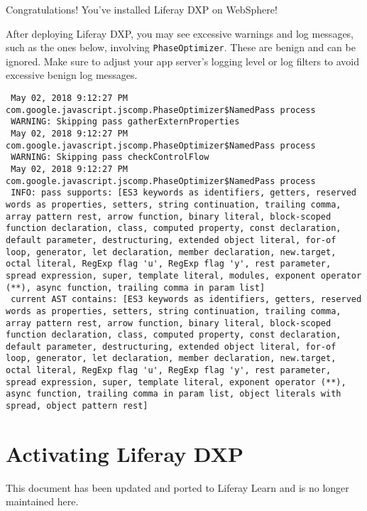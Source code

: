 Congratulations! You've installed Liferay DXP on WebSphere!

\noindent\hrulefill

After deploying Liferay DXP, you may see excessive warnings and log
messages, such as the ones below, involving \texttt{PhaseOptimizer}.
These are benign and can be ignored. Make sure to adjust your app
server's logging level or log filters to avoid excessive benign log
messages.

\begin{verbatim}
 May 02, 2018 9:12:27 PM com.google.javascript.jscomp.PhaseOptimizer$NamedPass process
 WARNING: Skipping pass gatherExternProperties
 May 02, 2018 9:12:27 PM com.google.javascript.jscomp.PhaseOptimizer$NamedPass process
 WARNING: Skipping pass checkControlFlow
 May 02, 2018 9:12:27 PM com.google.javascript.jscomp.PhaseOptimizer$NamedPass process
 INFO: pass supports: [ES3 keywords as identifiers, getters, reserved words as properties, setters, string continuation, trailing comma, array pattern rest, arrow function, binary literal, block-scoped function declaration, class, computed property, const declaration, default parameter, destructuring, extended object literal, for-of loop, generator, let declaration, member declaration, new.target, octal literal, RegExp flag 'u', RegExp flag 'y', rest parameter, spread expression, super, template literal, modules, exponent operator (**), async function, trailing comma in param list]
 current AST contains: [ES3 keywords as identifiers, getters, reserved words as properties, setters, string continuation, trailing comma, array pattern rest, arrow function, binary literal, block-scoped function declaration, class, computed property, const declaration, default parameter, destructuring, extended object literal, for-of loop, generator, let declaration, member declaration, new.target, octal literal, RegExp flag 'u', RegExp flag 'y', rest parameter, spread expression, super, template literal, exponent operator (**), async function, trailing comma in param list, object literals with spread, object pattern rest]
\end{verbatim}

\chapter{Activating Liferay DXP}\label{activating-liferay-dxp}

{This document has been updated and ported to Liferay Learn and is no
longer maintained here.}

